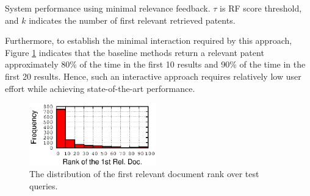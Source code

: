 \begin{table}[t!]
  \begin{center}
   \caption{System performance using minimal relevance feedback. $\tau$ is RF score threshold, and $k$ indicates the number of first relevant retrieved patents.}\vspace{3mm}
     
  \label{tab:firstrel}
  \end{center}  
\end{table}

Furthermore, to establish the minimal interaction required by this
approach, Figure \ref{fig:FirstTPRankHisto} indicates that the
baseline methods return a relevant patent approximately 80\% of the
time in the first 10 results and 90\% of the time in the first 20
results.  Hence, such an interactive approach requires relatively low
user effort while achieving state-of-the-art performance.


\begin{figure}
\begin{centering}
\includegraphics[width=5.5cm]{imgs/1stRank}
\par\end{centering}

\protect\caption{The distribution of the first relevant document rank over test queries.}
\label{fig:FirstTPRankHisto}
\end{figure}



